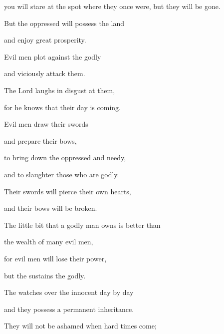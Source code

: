 {\par }{\Q you will stare
at the spot where
they once
were, but they will be gone.
\par }{\Q {}But the oppressed
will possess
the land
\par }{\Q and enjoy
great
prosperity.
\par }{\Q {}Evil men
plot
against the godly
\par }{\Q and viciously
attack them.
\par }{\Q {}The Lord
laughs
in disgust at them,
\par }{\Q for
he knows that
their day
is coming.
\par }{\Q {}Evil
men draw
their swords
\par }{\Q and prepare
their bows,
\par }{\Q to bring down
the oppressed
and needy,
\par }{\Q and to slaughter
those who are godly.
\par }{\Q {}Their swords
will pierce
their own hearts,
\par }{\Q and their bows
will be broken.
\par }{\Q {}The little
bit that a godly
man owns is better
than
\par }{\Q the wealth
of many
evil men,
\par }{\Q {}for
evil
men will lose
their power,
\par }{\Q but the
{}
sustains
the godly.
\par }{\Q {}The
{}
watches
over the innocent
day
by day

\par }{\Q and they possess a permanent
inheritance.
\par }{\Q {}They will not
be ashamed
when hard
times
come;

}
